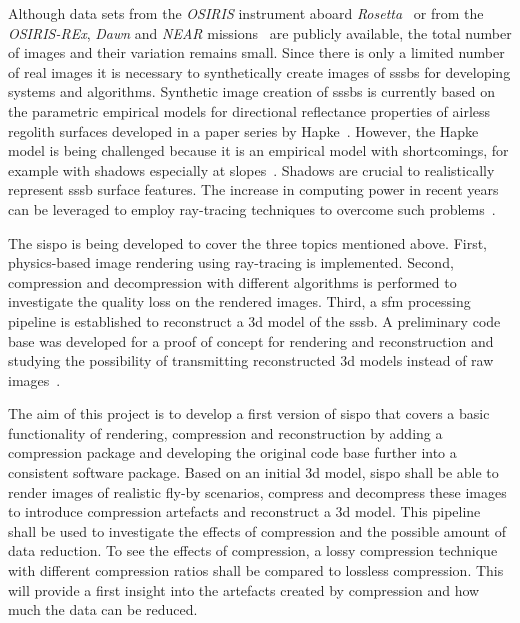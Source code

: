 Although data sets from the \textit{OSIRIS} instrument aboard \textit{Rosetta}~\cite{osirisArchive} or from the \textit{OSIRIS-REx}, \textit{Dawn} and \textit{NEAR} missions~\cite{palmer2014small} are publicly available, the total number of images and their variation remains small. Since there is only a limited number of real images it is necessary to synthetically create images of \glspl{sssb} for developing systems and algorithms. Synthetic image creation of \glspl{sssb} is currently based on the parametric empirical models for directional reflectance properties of airless regolith surfaces developed in a paper series by Hapke~\cite{Hapke1981BidirectionalTheory, hapke1981bidirectional2, Hapke1984BidirectionalRoughness, Hapke1986BidirectionalEffect, Hapke2002BidirectionalScattering, Hapke2008BidirectionalPorosity, Hapke2012Bidirectional7}. However, the Hapke model is being challenged because it is an empirical model with shortcomings, for example with shadows especially at slopes~\cite{shkuratov2012critical}. Shadows are crucial to realistically represent \gls{sssb} surface features. The increase in computing power in recent years can be leveraged to employ ray-tracing techniques to overcome such problems~\cite{shkuratov2012critical, lafortune1996mathematical}.


The \gls{sispo} is being developed to cover the three topics mentioned above. First, physics-based image rendering using ray-tracing is implemented. Second, compression and decompression with different algorithms is performed to investigate the quality loss on the rendered images. Third, a \gls{sfm} processing pipeline is established to reconstruct a \gls{3d} model of the \gls{sssb}. A preliminary code base was developed for a proof of concept for rendering and reconstruction and studying the possibility of transmitting reconstructed \gls{3d} models instead of raw images~\cite{Pajusalu2019CharacterizationMapping}.

The aim of this project is to develop a first version of \gls{sispo} that covers a basic functionality of rendering, compression and reconstruction by adding a compression package and developing the original code base further into a consistent software package. Based on an initial \gls{3d} model, \gls{sispo} shall be able to render images of realistic fly-by scenarios, compress and decompress these images to introduce compression artefacts and reconstruct a \gls{3d} model. This pipeline shall be used to investigate the effects of compression and the possible amount of data reduction. To see the effects of compression, a lossy compression technique with different compression ratios shall be compared to lossless compression. This will provide a first insight into the artefacts created by compression and how much the data can be reduced.

